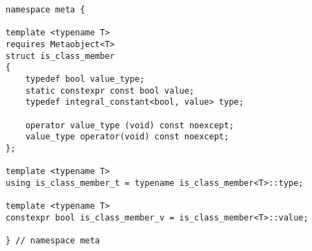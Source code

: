 
\begin{verbatim}
namespace meta {

template <typename T>
requires Metaobject<T>
struct is_class_member
{
	typedef bool value_type;
	static constexpr const bool value;
	typedef integral_constant<bool, value> type;

	operator value_type (void) const noexcept;
	value_type operator(void) const noexcept;
};

template <typename T>
using is_class_member_t = typename is_class_member<T>::type;

template <typename T>
constexpr bool is_class_member_v = is_class_member<T>::value;

} // namespace meta
\end{verbatim}
